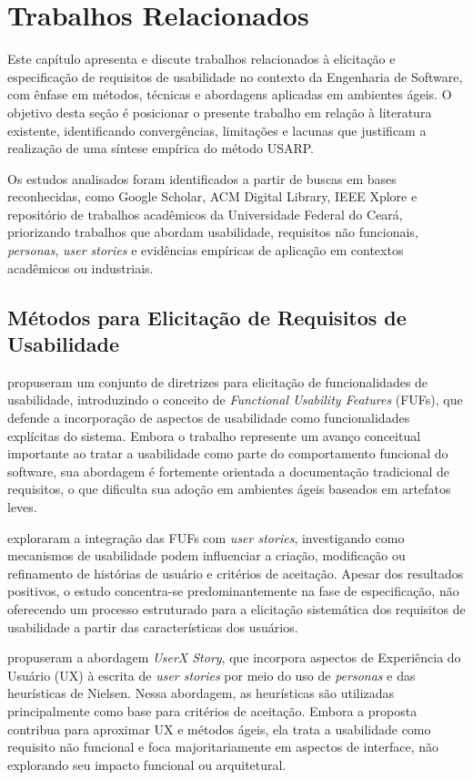 \chapter{Trabalhos Relacionados}
\label{cap:trabalhos-relacionados}

Este capítulo apresenta e discute trabalhos relacionados à elicitação e especificação de requisitos de usabilidade no contexto da Engenharia de Software, com ênfase em métodos, técnicas e abordagens aplicadas em ambientes ágeis. O objetivo desta seção é posicionar o presente trabalho em relação à literatura existente, identificando convergências, limitações e lacunas que justificam a realização de uma síntese empírica do método USARP.

Os estudos analisados foram identificados a partir de buscas em bases reconhecidas, como Google Scholar, ACM Digital Library, IEEE Xplore e repositório de trabalhos acadêmicos da Universidade
Federal do Ceará, priorizando trabalhos que abordam usabilidade, requisitos não funcionais, \textit{personas}, \textit{user stories} e evidências empíricas de aplicação em contextos acadêmicos ou industriais.

\section{Métodos para Elicitação de Requisitos de Usabilidade}

 propuseram um conjunto de diretrizes para elicitação de funcionalidades de usabilidade, introduzindo o conceito de \textit{Functional Usability Features} (FUFs), que defende a incorporação de aspectos de usabilidade como funcionalidades explícitas do sistema. Embora o trabalho represente um avanço conceitual importante ao tratar a usabilidade como parte do comportamento funcional do software, sua abordagem é fortemente orientada a documentação tradicional de requisitos, o que dificulta sua adoção em ambientes ágeis baseados em artefatos leves.

 exploraram a integração das FUFs com \textit{user stories}, investigando como mecanismos de usabilidade podem influenciar a criação, modificação ou refinamento de histórias de usuário e critérios de aceitação. Apesar dos resultados positivos, o estudo concentra-se predominantemente na fase de especificação, não oferecendo um processo estruturado para a elicitação sistemática dos requisitos de usabilidade a partir das características dos usuários.

 propuseram a abordagem \textit{UserX Story}, que incorpora aspectos de Experiência do Usuário (UX) à escrita de \textit{user stories} por meio do uso de \textit{personas} e das heurísticas de Nielsen. Nessa abordagem, as heurísticas são utilizadas principalmente como base para critérios de aceitação. Embora a proposta contribua para aproximar UX e métodos ágeis, ela trata a usabilidade como requisito não funcional e foca majoritariamente em aspectos de interface, não explorando seu impacto funcional ou arquitetural.

